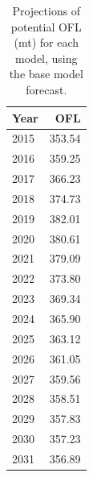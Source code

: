 \documentclass[12pt,]{article}
\begin{document}
\begin{table}[ht]
\centering
\caption{Projections of potential OFL (mt) for 
                                        each model, using the base model forecast.} 
\label{tab:OFL_projection}
\begin{tabular}{lr}
  \hline
Year & OFL \\ 
  \hline
2015 & 353.54 \\ 
  2016 & 359.25 \\ 
  2017 & 366.23 \\ 
  2018 & 374.73 \\ 
  2019 & 382.01 \\ 
  2020 & 380.61 \\ 
  2021 & 379.09 \\ 
  2022 & 373.80 \\ 
  2023 & 369.34 \\ 
  2024 & 365.90 \\ 
  2025 & 363.12 \\ 
  2026 & 361.05 \\ 
  2027 & 359.56 \\ 
  2028 & 358.51 \\ 
  2029 & 357.83 \\ 
  2030 & 357.23 \\ 
  2031 & 356.89 \\ 
   \hline
\end{tabular}
\end{table}\begin{table}[ht]
\centering
\caption{Summary of 10-year 
                                             projections beginning in 2016 
                                             for alternate states of nature based on 
                                             an axis of uncertainty for the California model.  Columns range over low, mid, and high
                                             states of nature, and rows range over different 
                                             assumptions of catch levels. An entry of "--" 
                                             indicates that the stock is driven to very low 
                                             abundance under the particular scenario.} 
\label{tab:Decision_table_mod1}
\end{table}
\end{document}

